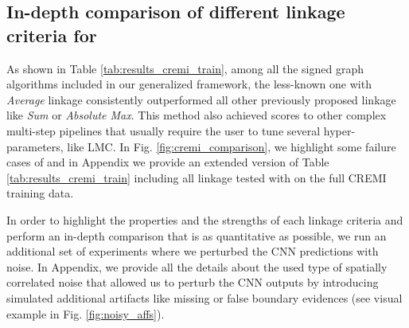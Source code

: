 


\subsection{In-depth comparison of different linkage criteria for \algname{}} \label{sec:comparison_exps}
As shown in Table \ref{tab:results_cremi_train}, among all the signed graph algorithms included in our generalized framework, the less-known one with \emph{Average} linkage consistently outperformed all other previously proposed linkage like \emph{Sum} or \emph{Absolute Max}. This method also achieved  scores to other complex multi-step pipelines that usually require the user to tune several hyper-parameters, like LMC. 
In Fig. \ref{fig:cremi_comparison}, we highlight some failure cases of \algname{} and in Appendix we provide an extended version of Table \ref{tab:results_cremi_train} including all linkage tested with \algname{} on the full CREMI training data. 

In order to highlight the properties and the strengths of each linkage criteria and  perform an in-depth comparison that is as quantitative as possible, we run an additional set of experiments where we perturbed the CNN predictions with noise. In Appendix, we provide all the details about the used type of spatially correlated noise that allowed us to perturb the CNN outputs by introducing simulated additional artifacts like missing or false boundary evidences (see visual example in Fig. \ref{fig:noisy_affs}).  

